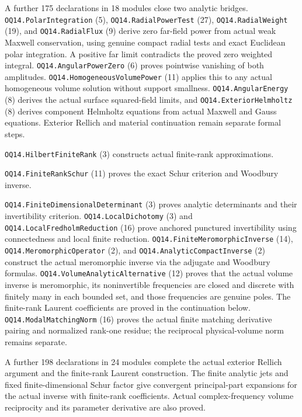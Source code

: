 A further 175 declarations in 18 modules close two analytic bridges.
\texttt{OQ14.\allowbreak PolarIntegration} (5),
\texttt{OQ14.\allowbreak RadialPowerTest} (27),
\texttt{OQ14.\allowbreak RadialWeight} (19), and
\texttt{OQ14.\allowbreak RadialFlux} (9) derive zero far-field power
from actual weak Maxwell conservation, using genuine compact radial tests
and exact Euclidean polar integration. A positive far limit contradicts
the proved zero weighted integral. \texttt{OQ14.\allowbreak AngularPowerZero}
(6) proves pointwise vanishing of both amplitudes.
\texttt{OQ14.\allowbreak HomogeneousVolumePower} (11) applies this to
any actual homogeneous volume solution without support smallness.
\texttt{OQ14.\allowbreak AngularEnergy} (8) derives the actual surface
squared-field limits, and \texttt{OQ14.\allowbreak ExteriorHelmholtz} (8)
derives component Helmholtz equations from actual Maxwell and Gauss equations.
Exterior Rellich and material continuation remain separate formal steps.

\texttt{OQ14.\allowbreak HilbertFiniteRank} (3) constructs actual finite-rank
approximations.

\texttt{OQ14.\allowbreak FiniteRankSchur} (11) proves the
exact Schur criterion and Woodbury inverse.

\texttt{OQ14.\allowbreak FiniteDimensional\allowbreak Determinant} (3) proves analytic
determinants and their invertibility criterion.
\texttt{OQ14.\allowbreak LocalDichotomy} (3) and
\texttt{OQ14.\allowbreak LocalFredholmReduction} (16) prove anchored
punctured invertibility using connectedness and local finite reduction.
\texttt{OQ14.\allowbreak FiniteMeromorphic\allowbreak Inverse} (14),
\texttt{OQ14.\allowbreak Meromorphic\allowbreak Operator} (2), and
\texttt{OQ14.\allowbreak AnalyticCompact\allowbreak Inverse} (2) construct the actual
meromorphic inverse via the adjugate and Woodbury formulas.
\texttt{OQ14.\allowbreak VolumeAnalyticAlternative} (12) proves that the
actual volume inverse is meromorphic, its noninvertible frequencies are
closed and discrete with finitely many in each bounded set, and those
frequencies are genuine poles. The finite-rank Laurent coefficients are
proved in the continuation below. \texttt{OQ14.\allowbreak ModalMatchingNorm} (16)
proves the actual finite matching derivative pairing and normalized
rank-one residue; the reciprocal physical-volume norm remains separate.

A further 198 declarations in 24 modules complete the actual
exterior Rellich argument and the finite-rank Laurent construction.
The finite analytic jets and fixed finite-dimensional Schur factor give
convergent principal-part expansions for the actual inverse with
finite-rank coefficients. Actual complex-frequency volume reciprocity
and its parameter derivative are also proved.

